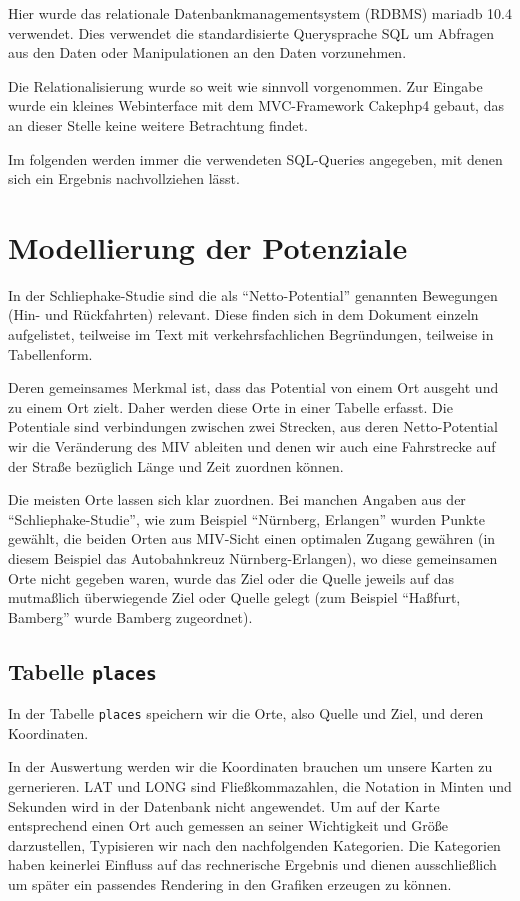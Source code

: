 \documentclass[fontsize=12pt,a4paper]{scrreprt}
\begin{document}
Hier wurde das relationale Datenbankmanagementsystem (RDBMS) mariadb 10.4 verwendet. Dies verwendet die standardisierte Querysprache SQL um Abfragen aus den Daten oder Manipulationen an den Daten vorzunehmen.

Die Relationalisierung wurde so weit wie sinnvoll vorgenommen. Zur Eingabe wurde ein kleines Webinterface mit dem MVC-Framework Cakephp4 gebaut, das an dieser Stelle keine weitere Betrachtung findet.

Im folgenden werden immer die verwendeten SQL-Queries angegeben, mit denen sich ein Ergebnis nachvollziehen lässt.

\section{Modellierung der Potenziale}
In der Schliephake-Studie sind die als \enquote{Netto-Potential} genannten Bewegungen (Hin- und Rückfahrten) relevant. Diese finden sich in dem Dokument einzeln aufgelistet, teilweise im Text mit verkehrsfachlichen Begründungen, teilweise in Tabellenform.

Deren gemeinsames Merkmal ist, dass das Potential von einem Ort ausgeht und zu einem Ort zielt. Daher werden diese Orte in einer Tabelle erfasst.
Die Potentiale sind verbindungen zwischen zwei Strecken, aus deren Netto-Potential wir die Veränderung des MIV ableiten und denen wir auch eine Fahrstrecke auf der Straße bezüglich Länge und Zeit zuordnen können.

Die meisten Orte lassen sich klar zuordnen. Bei manchen Angaben aus der \enquote{Schliephake-Studie}, wie zum Beispiel \enquote{Nürnberg, Erlangen} wurden Punkte gewählt, die beiden Orten aus MIV-Sicht einen optimalen Zugang gewähren (in diesem Beispiel das Autobahnkreuz Nürnberg-Erlangen), wo diese gemeinsamen Orte nicht gegeben waren, wurde das Ziel oder die Quelle jeweils auf das mutmaßlich überwiegende Ziel oder Quelle gelegt (zum Beispiel \enquote{Haßfurt, Bamberg} wurde Bamberg zugeordnet).

\subsection{Tabelle \texttt{places}}
In der Tabelle \texttt{places} speichern wir die Orte, also Quelle und Ziel, und deren Koordinaten.

In der Auswertung werden wir die Koordinaten brauchen um unsere Karten zu gernerieren. LAT und LONG sind Fließkommazahlen, die Notation in Minten und Sekunden wird in der Datenbank nicht angewendet.
Um auf der Karte entsprechend einen Ort auch gemessen an seiner Wichtigkeit und Größe darzustellen, Typisieren wir nach den nachfolgenden Kategorien.
Die Kategorien haben keinerlei Einfluss auf das rechnerische Ergebnis und dienen ausschließlich um später ein passendes Rendering in den Grafiken erzeugen zu können.
\end{document}
